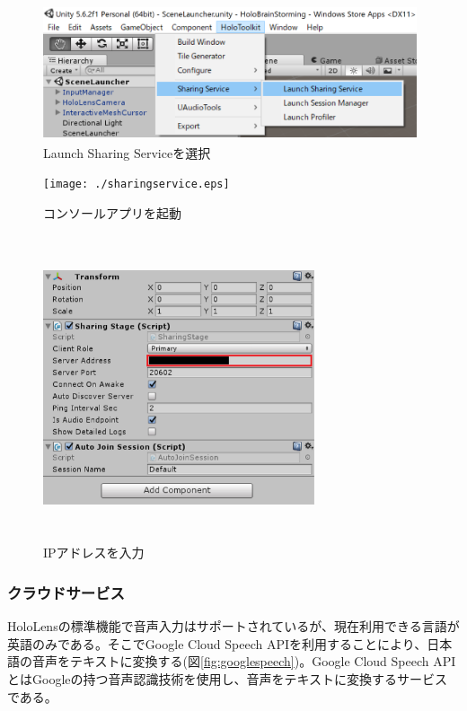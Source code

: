 \documentclass[11pt,a4j, titlepage]{jarticle} %
\begin{document}
\begin{figure}[H]
  \begin{center}
    \includegraphics[clip,height=4.0cm,width=11.0cm]{./toolbar.eps}
    \caption{Launch Sharing Serviceを選択}
    \label{fig:toolbar}
  \end{center}
\end{figure}

\begin{figure}[H]
  \begin{center}
    \texttt{[image: ./sharingservice.eps]}
    \caption{コンソールアプリを起動}
    \label{fig:sharingservice}
  \end{center}
\end{figure}

\begin{figure}[H]
  \begin{center}
    \includegraphics[clip,height=9.0cm,width=8.0cm]{./sharingstage.eps}
    \caption{IPアドレスを入力}
    \label{fig:sharingstage}
  \end{center}
\end{figure}

\subsubsection{クラウドサービス}
HoloLensの標準機能で音声入力はサポートされているが、現在利用できる言語が英語のみである\cite{emuniwa}。そこでGoogle Cloud Speech API\cite{google_speech}を利用することにより、日本語の音声をテキストに変換する(図\ref{fig:googlespeech})。Google Cloud Speech APIとはGoogleの持つ音声認識技術を使用し、音声をテキストに変換するサービスである。
\end{document}
